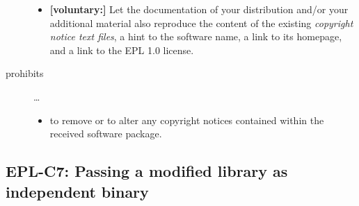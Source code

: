 \begin{description}
\begin{itemize}
  \item \textbf{[voluntary:]} Let the documentation of your distribution and/or
  your additional material  also reproduce the content of the existing
  \emph{copyright notice text files}, a hint to the software name, a link to its
  homepage, and a link to the EPL 1.0 license.

\end{itemize}

\item[prohibits] \ldots
\begin{itemize}
  \item to remove or to alter any copyright notices contained within the
  received software package.
\end{itemize}

\end{description}


\subsection{EPL-C7: Passing a modified library as independent binary}
\label{OSUC-08B-EPL}

